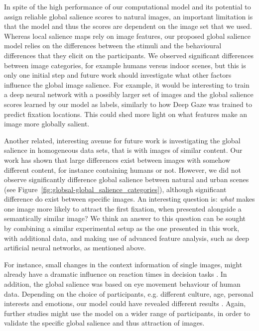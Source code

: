 {In spite of the high performance of our computational model and its potential to assign reliable global salience scores to natural images, an important limitation is that the model and thus the scores are dependent on the image set that we used. Whereas local salience maps rely on image features, our proposed global salience model relies on the differences between the stimuli and the behavioural differences that they elicit on the participants. We observed significant differences between image categories, for example humans versus indoor scenes, but this is only one initial step and future work should investigate what other factors influence the global image salience. For example, it would be interesting to train a deep neural network with a possibly larger  set of images and the global salience scores learned by our model as labels, similarly to how Deep Gaze was trained to predict fixation locations. This could shed more light on what features make an image more globally salient.

Another related, interesting avenue for future work is investigating the global salience in homogeneous data sets, that is with images of similar content. Our work has shown that large differences exist between images with somehow different content, for instance containing humans or not. However, we did not observe significantly difference global salience between natural and urban scenes (see Figure~\ref{fig:globsal-global_salience_categories}), although significant difference do exist between specific images. An interesting question is: \textit{what} makes one image more likely to attract the first fixation, when presented alongside a semantically similar image? We think an answer to this question can be sought by combining a similar experimental setup as the one presented in this work, with additional data, and making use of advanced feature analysis, such as deep artificial neural networks, as mentioned above.

For instance, small changes in the context information of single images, might already have a dramatic influence on reaction times in decision tasks \citep{kietzmann2015topdown}. In addition, the global salience was based on eye movement behaviour of human data. Depending on the choice of participants, e.g. different culture, age, personal interests and emotions, our model could have revealed different results \citep{balcetis2006topdown, dowiasch2015aging}. Again, further studies might use the model on a wider range of participants, in order to validate the specific global salience and thus attraction of images. 

}
